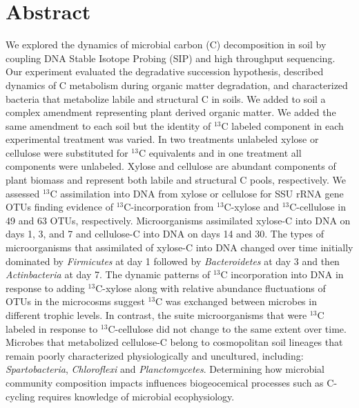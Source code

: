 \section{Abstract} We explored the dynamics of microbial carbon (C)
decomposition in soil by coupling DNA Stable Isotope Probing (SIP) and high
throughput sequencing. Our experiment evaluated the degradative succession
hypothesis, described dynamics of C metabolism during organic matter
degradation, and characterized bacteria that metabolize labile and structural
C in soils. We added to soil a complex amendment representing plant derived
organic matter. We added the same amendment to each soil but the identity of
$^{13}$C labeled component in each experimental treatment was varied. In two
treatments unlabeled xylose or cellulose were substituted for $^{13}$C
equivalents and in one treatment all components were unlabeled. Xylose and
cellulose are abundant components of plant biomass and represent both labile
and structural C pools, respectively. We assessed $^{13}$C assimilation into
DNA from xylose or cellulose for SSU rRNA gene OTUs finding evidence of
$^{13}$C-incorporation from $^{13}$C-xylose and $^{13}$C-cellulose in 49 and 63
OTUs, respectively. Microorganisms assimilated xylose-C into DNA on days 1, 3,
and 7 and cellulose-C into DNA on days 14 and 30. The types of microorganisms
that assimilated of xylose-C into DNA changed over time initially dominated by
\textit{Firmicutes} at day 1 followed by \textit{Bacteroidetes} at day 3 and
then \textit{Actinbacteria} at day 7. The dynamic patterns of $^{13}$C
incorporation into DNA in response to adding $^{13}$C-xylose along with
relative abundance fluctuations of OTUs in the microcosms suggest $^{13}$C was
exchanged between microbes in different trophic levels. In contrast, the suite
microorganisms that were $^{13}$C labeled in response to $^{13}$C-cellulose did
not change to the same extent over time. Microbes that metabolized cellulose-C
belong to cosmopolitan soil lineages that remain poorly characterized
physiologically and uncultured, including: \textit{Spartobacteria},
\textit{Chloroflexi} and \textit{Planctomycetes}. Determining how microbial
community composition impacts influences biogeocemical processes such as
C-cycling requires knowledge of microbial ecophysiology.
